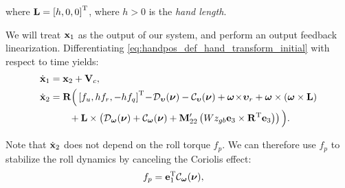 \vspace*{-1.5em}

\noindent where $\mathbf{L} = \left[h, 0, 0\right]^{\mathrm{T}}$, where $h > 0$ is the \emph{hand length}.

We will treat $\mathbf{x}_1$ as the output of our system, and perform an output feedback linearization.
Differentiating \eqref{eq:handpos_def_hand_transform_initial} with respect to time yields: \vspace*{-0.3em}
\begin{subequations}
    \begin{align}
        \dot{\mathbf{x}}_1 &= \mathbf{x}_2 + \mathbf{V}_c, \\
        \dot{\mathbf{x}}_2 &= \mathbf{R}\Big(\left[f_u, hf_r, -hf_q\right]^{\mathrm{T}}\! - \!\mathcal{D}_{\bm{\upsilon}}(\bm{\nu}) - \mathcal{C}_{\bm{\upsilon}}(\bm{\nu}) + \bm{\omega} \!\times\! \bm{\upsilon}_r + \bm{\omega} \times \left(\bm{\omega} \times \mathbf{L}\right) \label{eq:handpos_def_x_2_dot} \\
        & \qquad + \mathbf{L} \times \left(\mathcal{D}_{\bm{\omega}}(\bm{\nu}) + \mathcal{C}_{\bm{\omega}}(\bm{\nu}) + \mathbf{M}_{22}^{\prime}\left(Wz_{gb} \mathbf{e}_3 \times \mathbf{R}^{\mathrm{T}} \mathbf{e}_3\right)\right) \Big). \nonumber
    \end{align}
\end{subequations}

\noindent Note that $\dot{\mathbf{x}}_2$ does not depend on the roll torque $f_p$.
We can therefore use $f_p$ to stabilize the roll dynamics by canceling the Coriolis effect:
\begin{align}
    f_p &= \mathbf{e}_1^{\mathrm{T}} \mathcal{C}_{\bm{\omega}}(\bm{\nu}), \label{eq:handpos_def_roll_torque}
\end{align}


